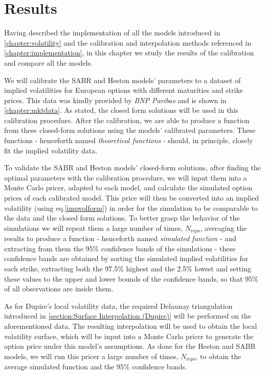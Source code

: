 \chapter{Results}
\label{chapter:results}
Having described the implementation of all the models introduced in \autoref{chapter:volatility} and the calibration and interpolation methods referenced in \autoref{chapter:implementation}, in this chapter we study the results of the calibration and compare all the models.

We will calibrate the SABR and Heston models' parameters to a dataset of implied volatilities for European options with different maturities and strike prices. This data was kindly provided by \emph{BNP Paribas} and is shown in \autoref{chapter:mktdata}. As stated, the closed form solutions will be used in this calibration procedure. After the calibration, we are able to produce a function from these closed-form solutions using the models' calibrated parameters. These functions - henceforth named \emph{theoretical functions} - should, in principle, closely fit the implied volatility data.

To validate the SABR and Heston models' closed-form solutions, after finding the optimal parameters with the calibration procedure, we will input them into a Monte Carlo pricer, adapted to each model, and calculate the simulated option prices of each calibrated model. This price will then be converted into an implied volatility (using eq.\eqref{impvolform}) in order for the simulation to be comparable to the data and the closed form solutions. To better grasp the behavior of the simulations we will repeat them a large number of times, $N_{\mathrm{reps}}$, averaging the results to produce a function - henceforth named \emph{simulated function} -  and extracting from them the 95\% confidence bands of the simulations - these confidence bands are obtained by sorting the simulated implied volatilities for each strike, extracting both the 97.5\% highest and the 2.5\% lowest and setting these values to the upper and lower bounds of the confidence bands, so that 95\% of all observations are inside them.



As for Dupire's local volatility data, the required Delaunay triangulation introduced in \autoref{section:Surface Interpolation (Dupire)} will be performed on the aforementioned data. The resulting interpolation will be used to obtain the local volatility surface, which will be input into a Monte Carlo pricer to generate the option price under this model's assumptions. As done for the Heston and SABR models, we will run this pricer a large number of times, $N_{\mathrm{reps}}$, to obtain the average simulated function and the 95\% confidence bands.


